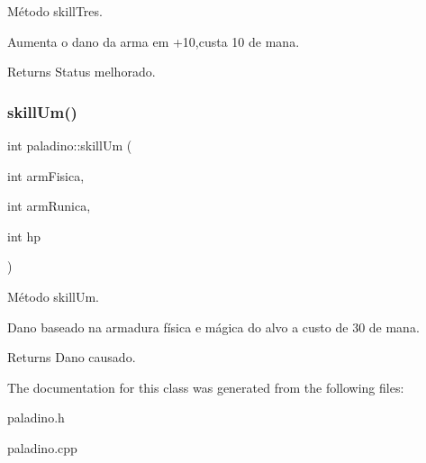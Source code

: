 Método skill\+Tres. 

Aumenta o dano da arma em +10,custa 10 de mana. \begin{DoxyReturn}{Returns}
Status melhorado. 
\end{DoxyReturn}
\mbox{\label{classpaladino_aaf70250e226146bab3bb421b253483d5}} 
\subsubsection{\texorpdfstring{skill\+Um()}{skillUm()}}
{\footnotesize\ttfamily int paladino\+::skill\+Um (\begin{DoxyParamCaption}\item[{int}]{arm\+Fisica,  }\item[{int}]{arm\+Runica,  }\item[{int}]{hp }\end{DoxyParamCaption})}



Método skill\+Um. 

Dano baseado na armadura física e mágica do alvo a custo de 30 de mana. \begin{DoxyReturn}{Returns}
Dano causado. 
\end{DoxyReturn}


The documentation for this class was generated from the following files\+:\begin{DoxyCompactItemize}
\item 
paladino.\+h\item 
paladino.\+cpp\end{DoxyCompactItemize}
